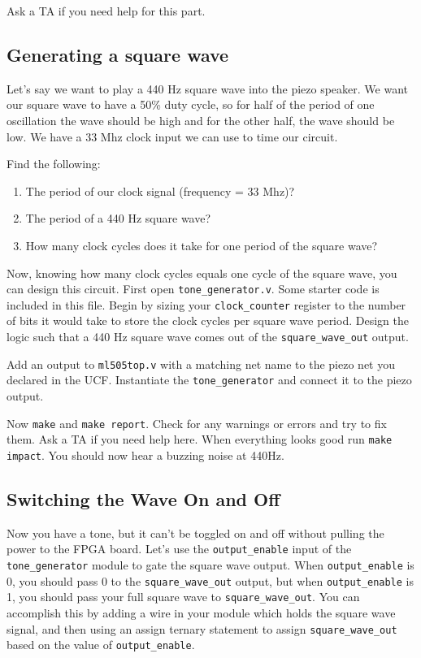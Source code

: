 \documentclass[11pt]{article}
\begin{document}
Ask a TA if you need help for this part.

\subsection{Generating a square wave}
Let's say we want to play a 440 Hz square wave into the piezo speaker. We want our square wave to have a 50\% duty cycle, so for half of the period of one oscillation the wave should be high and for the other half, the wave should be low. We have a 33 Mhz clock input we can use to time our circuit.

Find the following:
\begin{enumerate}
	\item The period of our clock signal (frequency = 33 Mhz)?
	\item The period of a 440 Hz square wave?
	\item How many clock cycles does it take for one period of the square wave?
\end{enumerate}

Now, knowing how many clock cycles equals one cycle of the square wave, you can design this circuit. First open \verb|tone_generator.v|. Some starter code is included in this file. Begin by sizing your \verb|clock_counter| register to the number of bits it would take to store the clock cycles per square wave period. Design the logic such that a 440 Hz square wave comes out of the \verb|square_wave_out| output.

Add an output to \verb|ml505top.v| with a matching net name to the piezo net you declared in the UCF. Instantiate the \verb|tone_generator| and connect it to the piezo output.

Now \verb|make| and \verb|make report|. Check for any warnings or errors and try to fix them. Ask a TA if you need help here. When everything looks good run \verb|make impact|. You should now hear a buzzing noise at 440Hz.

\subsection{Switching the Wave On and Off}
Now you have a tone, but it can't be toggled on and off without pulling the power to the FPGA board. Let's use the \verb|output_enable| input of the \verb|tone_generator| module to gate the square wave output. When \verb|output_enable| is 0, you should pass 0 to the \verb|square_wave_out| output, but when \verb|output_enable| is 1, you should pass your full square wave to \verb|square_wave_out|. You can accomplish this by adding a wire in your module which holds the square wave signal, and then using an assign ternary statement to assign \verb|square_wave_out| based on the value of \verb|output_enable|.
\end{document}
